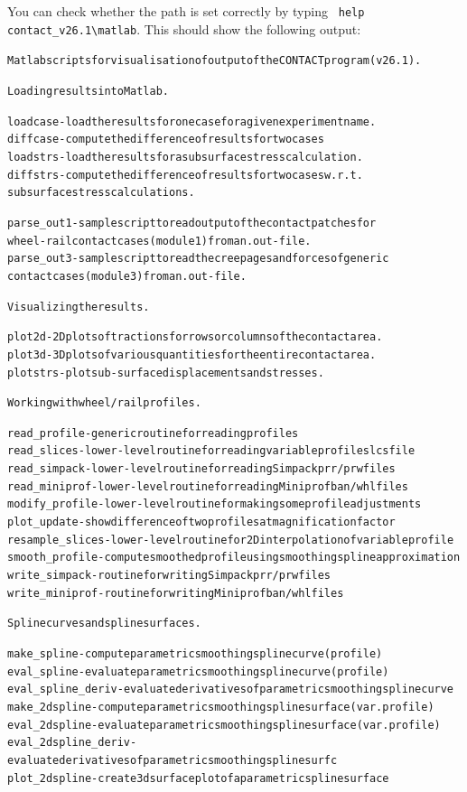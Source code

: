 \documentclass[12pt]{report}
\begin{document}
You can check whether the path is set correctly by typing
\verb+ help contact_v26.1\matlab+. This should show the following output:
\begin{alltt}\small
Matlab scripts for visualisation of output of the CONTACT program (v26.1).

Loading results into Matlab.

  loadcase   - load the results for one case for a given experiment name.
  diffcase   - compute the difference of results for two cases
  loadstrs   - load the results for a subsurface stress calculation.
  diffstrs   - compute the difference of results for two cases w.r.t.
               subsurface stress calculations.

  parse_out1 - sample script to read output of the contact patches for
               wheel-rail contact cases (module 1) from an .out-file.
  parse_out3 - sample script to read the creepages and forces of generic
               contact cases (module 3) from an .out-file.

Visualizing the results.

  plot2d     - 2D plots of tractions for rows or columns of the contact area.
  plot3d     - 3D plots of various quantities for the entire contact area.
  plotstrs   - plot sub-surface displacements and stresses.

Working with wheel/rail profiles.

  read_profile    - generic routine for reading profiles
  read_slices     - lower-level routine for reading variable profile slcs file
  read_simpack    - lower-level routine for reading Simpack prr/prw files
  read_miniprof   - lower-level routine for reading Miniprof ban/whl files
  modify_profile  - lower-level routine for making some profile adjustments
  plot_update     - show difference of two profiles at magnification factor
  resample_slices - lower-level routine for 2D interpolation of variable profile
  smooth_profile  - compute smoothed profile using smoothing spline approximation
  write_simpack   - routine for writing Simpack prr/prw files
  write_miniprof  - routine for writing Miniprof ban/whl files

Spline curves and spline surfaces.

  make_spline         - compute parametric smoothing spline curve (profile)
  eval_spline         - evaluate parametric smoothing spline curve (profile)
  eval_spline_deriv   - evaluate derivatives of parametric smoothing spline curve
  make_2dspline       - compute parametric smoothing spline surface (var.profile)
  eval_2dspline       - evaluate parametric smoothing spline surface (var.profile)
  eval_2dspline_deriv - evaluate derivatives of parametric smoothing spline surfc
  plot_2dspline       - create 3d surface plot of a parametric spline surface
\end{alltt}
\end{document}
